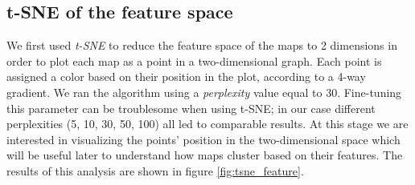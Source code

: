 \subsection{t-SNE of the feature space}

We first used \textit{t-SNE} to reduce the feature space of the maps to 2 dimensions in order to plot each map as a point in a two-dimensional graph. Each point is assigned a color based on their position in the plot, according to a 4-way gradient. We ran the algorithm using a \textit{perplexity} value equal to 30. Fine-tuning this parameter can be troublesome when using t-SNE; in our case different perplexities (5, 10, 30, 50, 100) all led to comparable results. At this stage we are interested in visualizing the points' position in the two-dimensional space which will be useful later to understand how maps cluster based on their features. The results of this analysis are shown in figure \cref{fig:tsne_feature}.

